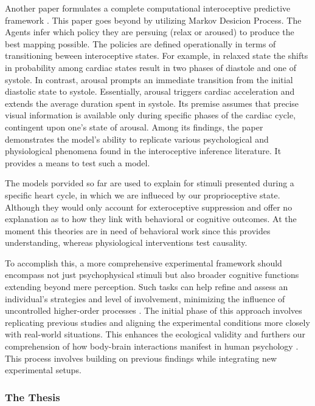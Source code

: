 \documentclass[12pt,oneside,openright]{report}
\begin{document}
Another paper formulates a complete computational interoceptive predictive framework \parencite{Allen2022}. This paper goes beyond by utilizing Markov Desicion Process. The Agents infer which policy they are persuing (relax or aroused) to produce the best mapping possible. The policies are defined operationally in terms of transitioning beween interoceptive states. For example, in relaxed state the shifts in probability among cardiac states result in two phases of diastole and one of systole. In contrast, arousal prompts an immediate transition from the initial diastolic state to systole. Essentially, arousal triggers cardiac acceleration and extends the average duration spent in systole. Its premise assumes that precise visual information is available only during specific phases of the cardiac cycle, contingent upon one's state of arousal. Among its findings, the paper demonstrates the model's ability to replicate various psychological and physiological phenomena found in the interoceptive inference literature. It provides a means to test such a model.

The models porvided so far are used to explain for stimuli presented during a specific heart cycle, in which we are influeced by our proprioceptive state. Although they would only account for exteroceptive suppression and offer no explanation as to how they link with behavioral or cognitive outcomes. At the moment this theories are in need of behavioral work since this provides understanding, whereas physiological interventions test causality\parencite{KRAKAUER2017480}.

To accomplish this, a more comprehensive experimental framework should encompass not just psychophysical stimuli but also broader cognitive functions extending beyond mere perception. Such tasks can help refine and assess an individual's strategies and level of involvement, minimizing the influence of uncontrolled higher-order processes \parencite{WASKOM2019100}. The initial phase of this approach involves replicating previous studies and aligning the experimental conditions more closely with real-world situations. This enhances the ecological validity and furthers our comprehension of how body-brain interactions manifest in human psychology \parencite{schmuckler2001ecological}. This process involves building on previous findings while integrating new experimental setups.

\subsubsection*{The Thesis}
\end{document}
